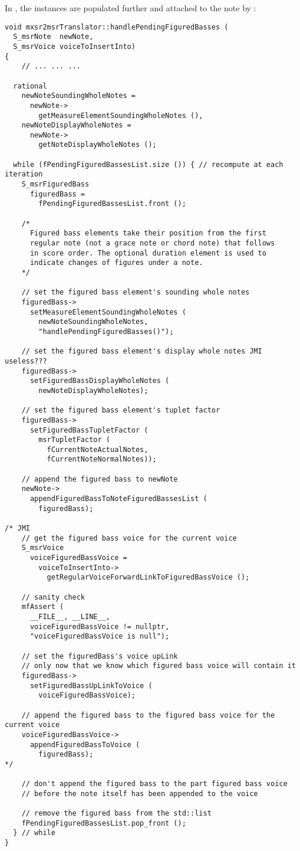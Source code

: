 In , the  instances are populated further and attached to the note by :
\begin{lstlisting}[language=CPlusPlus]
void mxsr2msrTranslator::handlePendingFiguredBasses (
  S_msrNote  newNote,
  S_msrVoice voiceToInsertInto)
{
	// ... ... ...

  rational
    newNoteSoundingWholeNotes =
      newNote->
        getMeasureElementSoundingWholeNotes (),
    newNoteDisplayWholeNotes =
      newNote->
        getNoteDisplayWholeNotes ();

  while (fPendingFiguredBassesList.size ()) { // recompute at each iteration
    S_msrFiguredBass
      figuredBass =
        fPendingFiguredBassesList.front ();

    /*
      Figured bass elements take their position from the first
      regular note (not a grace note or chord note) that follows
      in score order. The optional duration element is used to
      indicate changes of figures under a note.
    */

    // set the figured bass element's sounding whole notes
    figuredBass->
      setMeasureElementSoundingWholeNotes (
        newNoteSoundingWholeNotes,
        "handlePendingFiguredBasses()");

    // set the figured bass element's display whole notes JMI useless???
    figuredBass->
      setFiguredBassDisplayWholeNotes (
        newNoteDisplayWholeNotes);

    // set the figured bass element's tuplet factor
    figuredBass->
      setFiguredBassTupletFactor (
        msrTupletFactor (
          fCurrentNoteActualNotes,
          fCurrentNoteNormalNotes));

    // append the figured bass to newNote
    newNote->
      appendFiguredBassToNoteFiguredBassesList (
        figuredBass);

/* JMI
    // get the figured bass voice for the current voice
    S_msrVoice
      voiceFiguredBassVoice =
        voiceToInsertInto->
          getRegularVoiceForwardLinkToFiguredBassVoice ();

    // sanity check
    mfAssert (
      __FILE__, __LINE__,
      voiceFiguredBassVoice != nullptr,
      "voiceFiguredBassVoice is null");

    // set the figuredBass's voice upLink
    // only now that we know which figured bass voice will contain it
    figuredBass->
      setFiguredBassUpLinkToVoice (
        voiceFiguredBassVoice);

    // append the figured bass to the figured bass voice for the current voice
    voiceFiguredBassVoice->
      appendFiguredBassToVoice (
        figuredBass);
*/

    // don't append the figured bass to the part figured bass voice
    // before the note itself has been appended to the voice

    // remove the figured bass from the std::list
    fPendingFiguredBassesList.pop_front ();
  } // while
}
\end{lstlisting}

